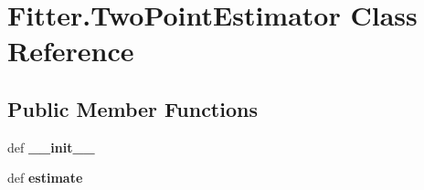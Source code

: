 \hypertarget{classFitter_1_1TwoPointEstimator}{\section{\-Fitter.\-Two\-Point\-Estimator \-Class \-Reference}
\label{classFitter_1_1TwoPointEstimator}
}
\subsection*{\-Public \-Member \-Functions}
\begin{DoxyCompactItemize}
\item 
\hypertarget{classFitter_1_1TwoPointEstimator_ac2100e8dc67ac0d999511f6e93d257c5}{def {\bfseries \-\_\-\-\_\-init\-\_\-\-\_\-}}\label{classFitter_1_1TwoPointEstimator_ac2100e8dc67ac0d999511f6e93d257c5}

\item 
\hypertarget{classFitter_1_1TwoPointEstimator_a1d30967d63d62fb4890f35a787ec1fca}{def {\bfseries estimate}}\label{classFitter_1_1TwoPointEstimator_a1d30967d63d62fb4890f35a787ec1fca}

\end{DoxyCompactItemize}
